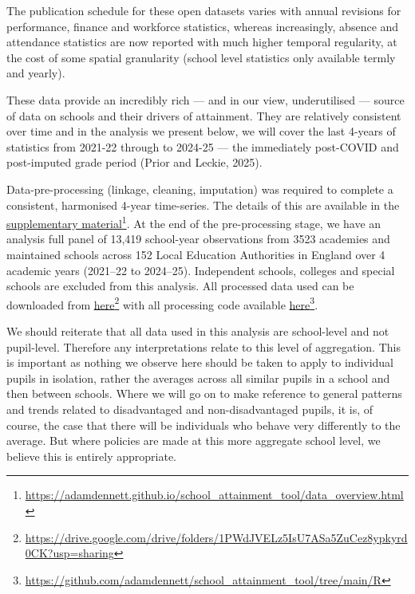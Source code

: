 \documentclass[
  11pt,
]{article}
\begin{document}
The publication schedule for these open datasets varies with annual
revisions for performance, finance and workforce statistics, whereas
increasingly, absence and attendance statistics are now reported with
much higher temporal regularity, at the cost of some spatial granularity
(school level statistics only available termly and yearly).

These data provide an incredibly rich --- and in our view, underutilised
--- source of data on schools and their drivers of attainment. They are
relatively consistent over time and in the analysis we present below, we
will cover the last 4-years of statistics from 2021-22 through to
2024-25 --- the immediately post-COVID and post-imputed grade period
(Prior and Leckie, 2025).

Data-pre-processing (linkage, cleaning, imputation) was required to
complete a consistent, harmonised 4-year time-series. The details of
this are available in the
\href{https://adamdennett.github.io/school_attainment_tool/data_overview.html}{supplementary
material}\footnote{\url{https://adamdennett.github.io/school_attainment_tool/data_overview.html}}.
At the end of the pre-processing stage, we have an analysis full panel
of 13,419 school-year observations from 3523 academies and maintained
schools across 152 Local Education Authorities in England over 4
academic years (2021--22 to 2024--25). Independent schools, colleges and
special schools are excluded from this analysis. All processed data used
can be downloaded from
\href{https://drive.google.com/drive/folders/1PWdJVELz5IsU7ASa5ZuCez8ypkyrd0CK?usp=sharing}{here}\footnote{\url{https://drive.google.com/drive/folders/1PWdJVELz5IsU7ASa5ZuCez8ypkyrd0CK?usp=sharing}}
with all processing code available
\href{https://github.com/adamdennett/school_attainment_tool/tree/main/R}{here}\footnote{\url{https://github.com/adamdennett/school_attainment_tool/tree/main/R}}.

We should reiterate that all data used in this analysis are school-level
and not pupil-level. Therefore any interpretations relate to this level
of aggregation. This is important as nothing we observe here should be
taken to apply to individual pupils in isolation, rather the averages
across all similar pupils in a school and then between schools. Where we
will go on to make reference to general patterns and trends related to
disadvantaged and non-disadvantaged pupils, it is, of course, the case
that there will be individuals who behave very differently to the
average. But where policies are made at this more aggregate school
level, we believe this is entirely appropriate.
\end{document}
